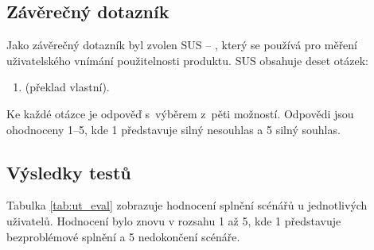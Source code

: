 \documentclass[thesis=M,czech]{FITthesis}[2012/06/26]
\begin{document}
\subsection{Závěrečný dotazník}
Jako závěrečný dotazník byl zvolen SUS -- , který se používá pro měření uživatelského vnímání použitelnosti produktu. SUS obsahuje deset otázek:
\begin{enumerate}
 \item {} (překlad vlastní).
\end{enumerate}
Ke každé otázce je odpověď s~výběrem z~pěti možností. Odpovědi jsou ohodnoceny 1--5, kde 1 představuje silný nesouhlas a 5 silný souhlas. \cite{sus}

\subsection{Výsledky testů}
Tabulka \ref{tab:ut_eval} zobrazuje hodnocení splnění scénářů u jednotlivých uživatelů. Hodnocení bylo znovu v rozsahu 1 až 5, kde 1 představuje bezproblémové splnění a 5 nedokončení scénáře.
\end{document}
